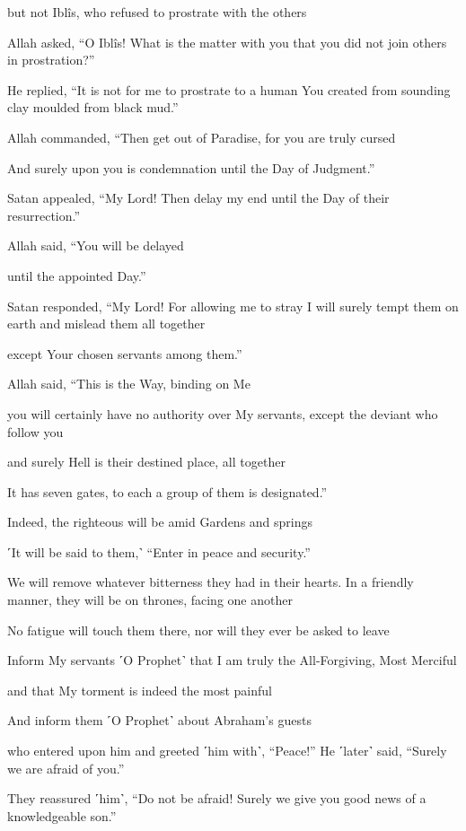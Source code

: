 but not Iblîs, who refused to prostrate with the others

Allah asked, “O Iblîs! What is the matter with you that you did not join others in prostration?”

He replied, “It is not for me to prostrate to a human You created from sounding clay moulded from black mud.”

Allah commanded, “Then get out of Paradise, for you are truly cursed

And surely upon you is condemnation until the Day of Judgment.”

Satan appealed, “My Lord! Then delay my end until the Day of their resurrection.”

Allah said, “You will be delayed

until the appointed Day.”

Satan responded, “My Lord! For allowing me to stray I will surely tempt them on earth and mislead them all together

except Your chosen servants among them.”

Allah said, “This is the Way, binding on Me

you will certainly have no authority over My servants, except the deviant who follow you

and surely Hell is their destined place, all together

It has seven gates, to each a group of them is designated.”

Indeed, the righteous will be amid Gardens and springs

˹It will be said to them,˺ “Enter in peace and security.”

We will remove whatever bitterness they had in their hearts. In a friendly manner, they will be on thrones, facing one another

No fatigue will touch them there, nor will they ever be asked to leave

Inform My servants ˹O Prophet˺ that I am truly the All-Forgiving, Most Merciful

and that My torment is indeed the most painful

And inform them ˹O Prophet˺ about Abraham’s guests

who entered upon him and greeted ˹him with˺, “Peace!” He ˹later˺ said, “Surely we are afraid of you.”

They reassured ˹him˺, “Do not be afraid! Surely we give you good news of a knowledgeable son.”

